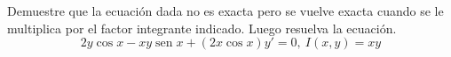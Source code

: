 \item Demuestre que la ecuación dada no es exacta pero se vuelve exacta cuando se le multiplica por el factor integrante indicado. Luego resuelva la ecuación.
    \[ 2y \cos x - xy \operatorname{sen} x + (2x \cos x)y' = 0, \ I(x, y) = xy \]
